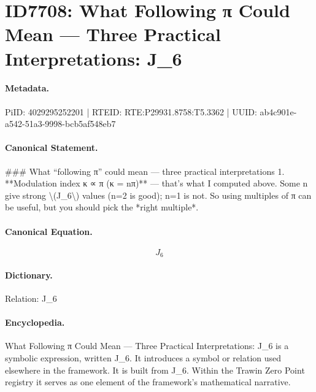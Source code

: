 \section*{ID7708: What Following π Could Mean — Three Practical Interpretations: J\_6}
\paragraph{Metadata.}
PiID: 4029295252201 | RTEID: RTE:P29931.8758:T5.3362 | UUID: ab4c901e-a542-51a3-9998-bcb5af548eb7

\paragraph{Canonical Statement.}
\#\#\# What “following π” could mean — three practical interpretations 1. **Modulation index κ ∝ π (κ = nπ)** — that’s what I computed above. Some n give strong \textbackslash{}(J\_6\textbackslash{}) values (n=2 is good); n=1 is not. So using multiples of π can be useful, but you should pick the *right multiple*.

\paragraph{Canonical Equation.}
\[
J_6
\]

\paragraph{Dictionary.}
Relation: J\_6

\paragraph{Encyclopedia.}
What Following π Could Mean — Three Practical Interpretations: J\_6 is a symbolic expression, written J\_6. It introduces a symbol or relation used elsewhere in the framework. It is built from J\_6. Within the Trawin Zero Point registry it serves as one element of the framework's mathematical narrative.
